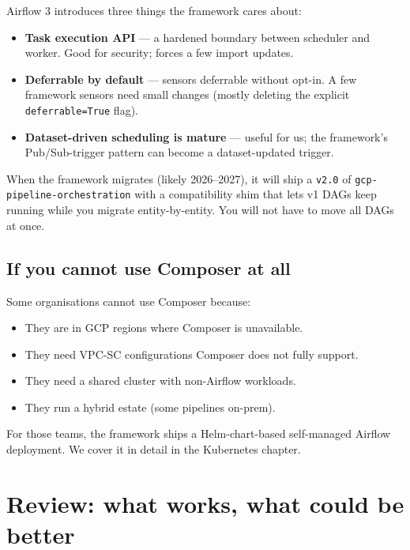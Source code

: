 \documentclass[
  11pt,
  british,
  oneside]{book}
\providecommand{\tightlist}{%
  \setlength{\itemsep}{0pt}\setlength{\parskip}{0pt}}
\begin{document}
Airflow 3 introduces three things the framework cares about:

\begin{itemize}
\tightlist
\item
  \textbf{Task execution API} --- a hardened boundary between scheduler
  and worker. Good for security; forces a few import updates.
\item
  \textbf{Deferrable by default} --- sensors deferrable without opt-in.
  A few framework sensors need small changes (mostly deleting the
  explicit \texttt{deferrable=True} flag).
\item
  \textbf{Dataset-driven scheduling is mature} --- useful for us; the
  framework's Pub/Sub-trigger pattern can become a dataset-updated
  trigger.
\end{itemize}

When the framework migrates (likely 2026--2027), it will ship a
\texttt{v2.0} of \texttt{gcp-pipeline-orchestration} with a
compatibility shim that lets v1 DAGs keep running while you migrate
entity-by-entity. You will not have to move all DAGs at once.

\hypertarget{if-you-cannot-use-composer-at-all}{%
\subsection{If you cannot use Composer at
all}\label{if-you-cannot-use-composer-at-all}}

Some organisations cannot use Composer because:

\begin{itemize}
\tightlist
\item
  They are in GCP regions where Composer is unavailable.
\item
  They need VPC-SC configurations Composer does not fully support.
\item
  They need a shared cluster with non-Airflow workloads.
\item
  They run a hybrid estate (some pipelines on-prem).
\end{itemize}

For those teams, the framework ships a Helm-chart-based self-managed
Airflow deployment. We cover it in detail in the Kubernetes chapter.

\hypertarget{review-what-works-what-could-be-better-2}{%
\section{Review: what works, what could be
better}\label{review-what-works-what-could-be-better-2}}
\end{document}
